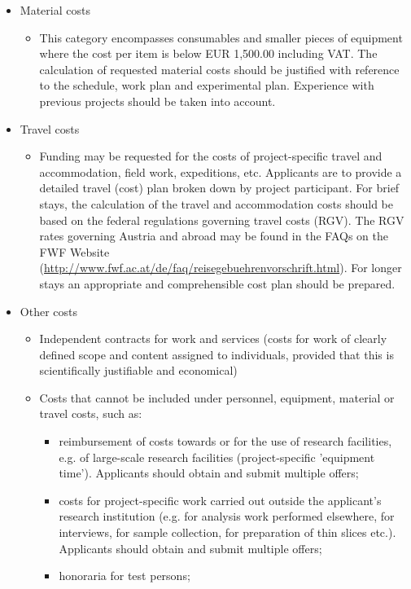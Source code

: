 \documentclass[a4paper,11pt]{article}
\begin{document}
{\begin{itemize}
\begin{itemize}
	\end{itemize}
\item Material costs
	\begin{itemize}
	\item     This category encompasses consumables and smaller pieces of equipment where the cost per item is below EUR 1,500.00 including VAT. The calculation of requested material costs should be justified with reference to the schedule, work plan and experimental plan. Experience with previous projects should be taken into account.
	\end{itemize}
\item Travel costs
	\begin{itemize}
	\item     Funding may be requested for the costs of project-specific travel and accommodation, field work, expeditions, etc. Applicants are to provide a detailed travel (cost) plan broken down by project participant. For brief stays, the calculation of the travel and accommodation costs should be based on the federal regulations governing travel costs (RGV). The RGV rates governing Austria and abroad may be found in the FAQs on the FWF Website (\href{http://www.fwf.ac.at/de/faq/reisegebuehrenvorschrift.html}{http://www.fwf.ac.at/de/faq/reisegebuehrenvorschrift.html}). For longer stays an appropriate and comprehensible cost plan should be prepared.
	\end{itemize}
\item Other costs
	\begin{itemize}
	\item     Independent contracts for work and services (costs for work of clearly defined scope and content assigned to individuals, provided that this is scientifically justifiable and economical)
    	\item     Costs that cannot be included under personnel, equipment, material or travel costs, such as:
		\begin{itemize}
		\item         reimbursement of costs towards or for the use of research facilities, e.g. of large-scale research facilities (project-specific 'equipment time'). Applicants should obtain and submit multiple offers;
		\item         costs for project-specific work carried out outside the applicant's research institution (e.g. for analysis work performed elsewhere, for interviews, for sample collection, for preparation of thin slices etc.). Applicants should obtain and submit multiple offers;
		\item         honoraria for test persons;
		\end{itemize}
	\end{itemize}
\end{itemize}
}
\end{document}
